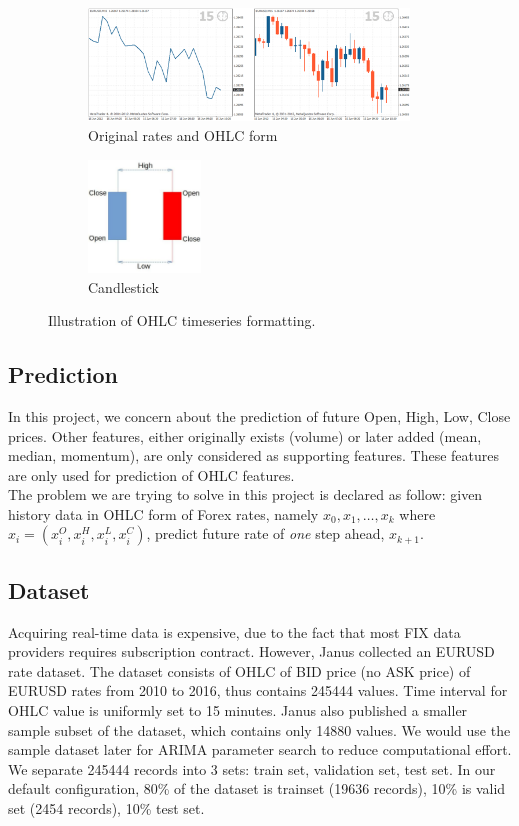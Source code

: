 \documentclass[11pt]{article}
\begin{document}
\begin{figure}
    \begin{subfigure}[b]{0.5\textwidth}
      \includegraphics[height=3cm]{figs/ohlc.png}
      \caption{Original rates and OHLC form}
    \end{subfigure}
    \quad\quad\quad\quad\quad\quad\quad
    \begin{subfigure}[b]{0.2\textwidth}
      \includegraphics[height=3cm]{figs/candle.png}
      \caption{Candlestick}
    \end{subfigure}
    \caption{Illustration of OHLC timeseries formatting.}
\end{figure}

\subsection{Prediction}
In this project, we concern about the prediction of future Open, High, Low,
Close prices. Other features, either originally exists (volume) or later added
(mean, median, momentum), are only considered as supporting features. These
features are only used for prediction of OHLC features.\\
The problem we are trying to solve in this project is declared as follow: given
history data in OHLC form of Forex rates, namely $x_0, x_1,\ldots,x_k$ where
$x_i=(x^O_i, x^H_i, x^L_i, x^C_i )$, predict future rate of \textit{one} step
ahead, $x_{k+1}$. 

\subsection{Dataset}
Acquiring real-time data is expensive, due to the fact that most FIX data
providers requires subscription contract. However, Janus \cite{meehau16eurusd}
collected an EURUSD rate dataset. The dataset consists of OHLC of BID price (no
ASK price) of EURUSD rates from 2010 to 2016, thus contains 245444 values. Time
interval for OHLC value is uniformly set to 15 minutes. Janus also published a
smaller sample subset of the dataset, which contains only 14880 values. We would
use the sample dataset later for ARIMA parameter search to reduce computational
effort.\\
We separate 245444 records into 3 sets: train set, validation set, test set. In
our default configuration, 80\% of the dataset is trainset (19636 records), 10\%
is valid set (2454 records), 10\% test set.\\
\end{document}
